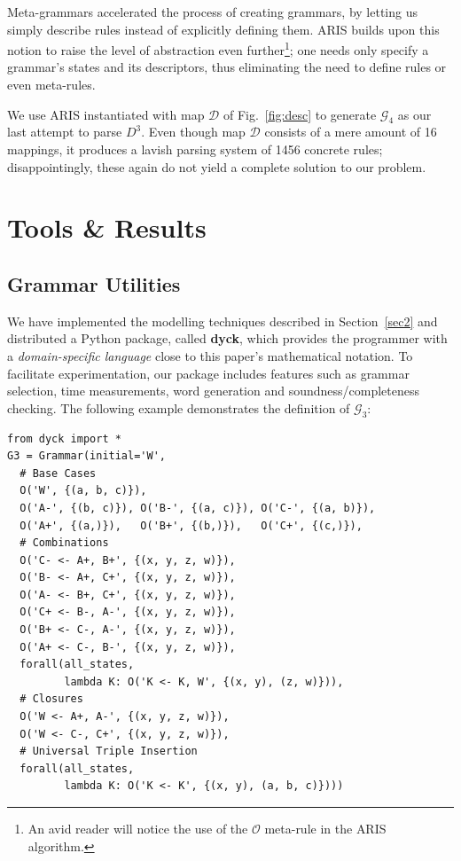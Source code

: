 \documentclass{llncs}
\begin{document}
Meta-grammars accelerated the process of creating grammars, by letting us simply describe rules instead of explicitly defining them. \textsc{ARIS} builds upon this notion to raise the level of abstraction even further\footnote{An avid reader will notice the use of the $\mathcal{O}$ meta-rule in the \textsc{ARIS} algorithm.}; one needs only specify a grammar's states and its descriptors, thus eliminating the need to define rules or even meta-rules.

We use \textsc{ARIS} instantiated with map $\mathcal{D}$ of Fig.~\ref{fig:desc} to generate
$\mathcal{G}_4$ as our last attempt to parse $D^3$.
Even though map $\mathcal{D}$ consists of a mere amount of 16 mappings,
it produces a lavish parsing system of 1456 concrete rules;
disappointingly, these again do not yield a complete solution to our problem.

\section{Tools \& Results}
\subsection{Grammar Utilities}
We have implemented the modelling techniques described in Section~\ref{sec2} and distributed a Python package, called \textbf{dyck}, which provides the programmer with a \textit{domain-specific language} close to this paper's mathematical notation. To facilitate experimentation, our package includes features such as grammar selection, time measurements, word generation and soundness/completeness checking. The following example demonstrates the definition of $\mathcal{G}_3$:

\begin{verbatim}
from dyck import *
G3 = Grammar(initial='W',
  # Base Cases
  O('W', {(a, b, c)}),
  O('A-', {(b, c)}), O('B-', {(a, c)}), O('C-', {(a, b)}),
  O('A+', {(a,)}),   O('B+', {(b,)}),   O('C+', {(c,)}),
  # Combinations
  O('C- <- A+, B+', {(x, y, z, w)}),
  O('B- <- A+, C+', {(x, y, z, w)}),
  O('A- <- B+, C+', {(x, y, z, w)}),
  O('C+ <- B-, A-', {(x, y, z, w)}),
  O('B+ <- C-, A-', {(x, y, z, w)}),
  O('A+ <- C-, B-', {(x, y, z, w)}),
  forall(all_states,
         lambda K: O('K <- K, W', {(x, y), (z, w)})),
  # Closures
  O('W <- A+, A-', {(x, y, z, w)}),
  O('W <- C-, C+', {(x, y, z, w)}),
  # Universal Triple Insertion
  forall(all_states,
         lambda K: O('K <- K', {(x, y), (a, b, c)})))
\end{verbatim}
\end{document}
